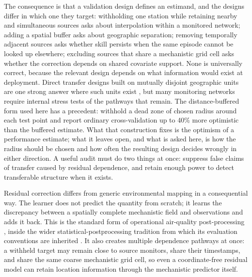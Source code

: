 The consequence is that a validation design defines an estimand, and the designs differ in which one they target: withholding one station while retaining nearby and simultaneous sources asks about interpolation within a monitored network; adding a spatial buffer asks about geographic separation; removing temporally adjacent sources asks whether skill persists when the same episode cannot be looked up elsewhere; excluding sources that share a mechanistic grid cell asks whether the correction depends on shared covariate support. None is universally correct, because the relevant design depends on what information would exist at deployment. Direct transfer designs built on mutually disjoint geographic units are one strong answer where such units exist \citep{patane2025}, but many monitoring networks require internal stress tests of the pathways that remain. The distance-buffered form used here has a precedent: \citet{pohjankukka2017skcv} withhold a dead zone of chosen radius around each test point and report ordinary cross-validation up to 40\% more optimistic than the buffered estimate. What that construction fixes is the optimism of a performance estimate; what it leaves open, and what is asked here, is how the radius should be chosen and how often the resulting design decides wrongly in either direction. A useful audit must do two things at once: suppress false claims of transfer caused by residual dependence, and retain enough power to detect transferable structure when it exists.

Residual correction differs from generic environmental mapping in a consequential way. The learner does not predict the quantity from scratch; it learns the discrepancy between a spatially complete mechanistic field and observations and adds it back. This is the standard form of operational air-quality post-processing \citep{djalalova2010,djalalova2015,huang2017,zhang2021ens,ye2022,skipper2024,miyazaki2025}, inside the wider statistical-postprocessing tradition from which its evaluation conventions are inherited \citep{vannitsem2021,rasp2018,schulz2022}. It also creates multiple dependence pathways at once: a withheld target may remain close to source monitors, share their timestamps, and share the same coarse mechanistic grid cell, so even a coordinate-free residual model can retain location information through the mechanistic predictor itself.

